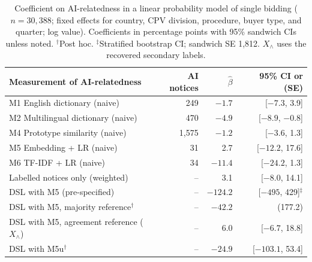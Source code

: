 \documentclass[runningheads]{llncs}
\begin{document}
\begin{table}[t]
\caption{Coefficient on AI-relatedness in a linear probability model of single bidding ($n=30{,}388$; fixed effects for country, CPV division, procedure, buyer type, and quarter; log value). Coefficients in percentage points with 95\% sandwich CIs unless noted. $^\dagger$Post hoc. $^\ddagger$Stratified bootstrap CI; sandwich SE 1,812. $X_\wedge$ uses the recovered secondary labels.}\label{tab:reg}
\centering
\begin{tabular}{lrrr}
\toprule
Measurement of AI-relatedness & AI notices & $\hat\beta$ & 95\% CI or (SE) \\
\midrule
M1 English dictionary (naive) & 249 & $-1.7$ & [$-7.3$, 3.9] \\
M2 Multilingual dictionary (naive) & 470 & $-4.9$ & [$-8.9$, $-0.8$] \\
M4 Prototype similarity (naive) & 1,575 & $-1.2$ & [$-3.6$, 1.3] \\
M5 Embedding + LR (naive) & 31 & 2.7 & [$-12.2$, 17.6] \\
M6 TF-IDF + LR (naive) & 34 & $-11.4$ & [$-24.2$, 1.3] \\
Labelled notices only (weighted) & -- & 3.1 & [$-8.0$, 14.1] \\
DSL with M5 (pre-specified) & -- & $-124.2$ & [$-495$, 429]$^\ddagger$ \\
DSL with M5, majority reference$^\dagger$ & -- & $-42.2$ & (177.2) \\
DSL with M5, agreement reference ($X_\wedge$) & -- & 6.0 & [$-6.7$, 18.8] \\
DSL with M5u$^\dagger$ & -- & $-24.9$ & [$-103.1$, 53.4] \\
\bottomrule
\end{tabular}
\end{table}
\end{document}
